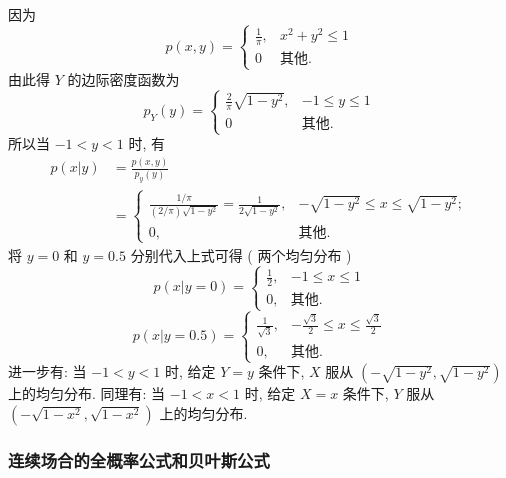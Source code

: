 	\begin{solution}
		因为
		\[
			p(x, y)=\left\{\begin{array}{ll}{\frac{1}{\pi},} & {x^{2}+y^{2} \leqslant 1} \\{0} & \text{其他}.\end{array}\right.
		\]
		由此得 $Y$ 的边际密度函数为
		\[
			p_{Y}(y)=\begin{cases}{\frac{2}{\pi} \sqrt{1-y^{2}}}, &-1\leq y\leq 1 \\{0} & \text{其他}.\end{cases}
		\]
		所以当 $-1<y<1$ 时, 有
		\begin{align*}
			p(x | y) &=\frac{p(x, y)}{p_{y}(y)} \\
			&=\begin{cases}
				\frac{1 / \pi}{(2 / \pi) \sqrt{1-y^{2}}}=\frac{1}{2 \sqrt{1-y^{2}}},& -\sqrt{1-y^{2}} \leq x \leq \sqrt{1-y^{2}};\\
				0,	&	\text{其他}.
			\end{cases}
		\end{align*}
		将 $y=0$ 和 $y=0.5$ 分别代入上式可得 ( 两个均匀分布 )
		\[
			p(x | y=0)=
			\begin{cases}
			{\frac{1}{2},} & {-1 \leq x \leq 1}	\\
			0,& \text{其他}.
			\end{cases}
		\]
		\[
			p(x | y=0.5)=\begin{cases}
				{\frac{1}{\sqrt{3}}}, &  -\frac{\sqrt{3}}{2} \leq x \leq \frac{\sqrt{3}}{2}\\
				{0},& \text{其他}. \end{cases}
		\]
		进一步有: 当 $-1<y<1$ 时, 给定 $Y=y$ 条件下, $X$ 服从 $\left(-\sqrt{1-y^{2}}, \sqrt{1-y^{2}}\right)$ 上的均匀分布. 同理有:
		当 $-1<x<1$ 时, 给定 $X=x$ 条件下, $Y$ 服从 $\left(-\sqrt{1-x^{2}}, \sqrt{1-x^{2}}\right)$ 上的均匀分布.
	\end{solution}

	\subsubsection{连续场合的全概率公式和贝叶斯公式}

